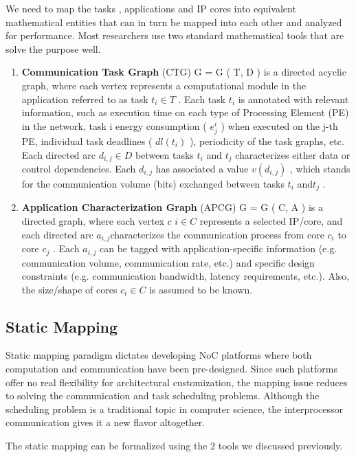 We need to map the tasks , applications and IP cores into equivalent
mathematical entities that can in turn be mapped into each other and
analyzed for performance. Most researchers use two standard mathematical
tools that are solve the purpose well.\cite{Ogras:2005:KRP:1084834.1084856}
\begin{enumerate}
\item \textbf{Communication Task Graph} (CTG) G\textasciiacute{} = G\textasciiacute{}
( T, D ) is a directed acyclic graph, where each vertex represents
a computational module in the application referred to as task $t_{i}\in T$
. Each task $t_{i}$ is annotated with relevant information, such
as execution time on each type of Processing Element (PE) in the network,
task i energy consumption ( $e_{j}^{i}$ ) when executed on the j-th
PE, individual task deadlines ( $dl(t_{i})$ ), periodicity of the
task graphs, etc. Each directed arc $d_{i,j}\in D$ between tasks
$t_{i}$ and $t_{j}$ characterizes either data or control dependencies.
Each $d_{i,j}$ has associated a value $v(d_{i,j})$ , which stands
for the communication volume (bits) exchanged between tasks $t_{i}$
and$t_{j}$ . 
\item \textbf{Application Characterization Graph} (APCG) G = G ( C, A )
is a directed graph, where each vertex $c$ $i\in C$ represents a
selected IP/core, and each directed arc $a_{i,j}$characterizes the
communication process from core $c_{i}$ to core $c_{j}$ . Each $a_{i,j}$
can be tagged with application-specific information (e.g. communication
volume, communication rate, etc.) and specific design constraints
(e.g. communication bandwidth, latency requirements, etc.). Also,
the size/shape of cores $c_{i}\in C$ is assumed to be known. 
\end{enumerate}

\subsection{Static Mapping}

Static mapping paradigm dictates developing NoC platforms where both
computation and communication have been pre-designed. Since such platforms
offer no real flexibility for architectural customization, the mapping
issue reduces to solving the communication and task scheduling problems.
Although the scheduling problem is a traditional topic in computer
science, the interprocessor communication gives it a new flavor altogether. 

The static mapping can be formalized using the 2 tools we discussed
previously. \cite{Ogras:2005:KRP:1084834.1084856}


